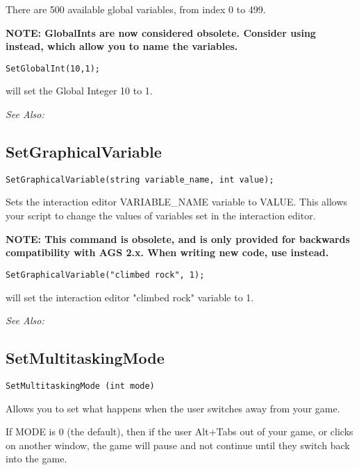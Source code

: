 There are 500 available global variables, from index 0 to 499.

\bf{NOTE:} GlobalInts are now considered obsolete. Consider using
 instead, which allow you to name
the variables.

\begin{verbatim}
SetGlobalInt(10,1);
\end{verbatim}
will set the Global Integer 10 to 1.

\it{See Also:} 


\subsection{SetGraphicalVariable}\label{SetGraphicalVariable}%

\begin{verbatim}
SetGraphicalVariable(string variable_name, int value);
\end{verbatim}
Sets the interaction editor VARIABLE_NAME variable to VALUE. This allows your
script to change the values of variables set in the interaction editor.

\bf{NOTE:} This command is obsolete, and is only provided for backwards compatibility
with AGS 2.x. When writing new code, use 
instead.

\begin{verbatim}
SetGraphicalVariable("climbed rock", 1);
\end{verbatim}
will set the interaction editor "climbed rock" variable to 1.

\it{See Also:} 


\subsection{SetMultitaskingMode}\label{SetMultitaskingMode}%

\begin{verbatim}
SetMultitaskingMode (int mode)
\end{verbatim}
Allows you to set what happens when the user switches away from your game.

If MODE is 0 (the default), then if the user Alt+Tabs out of your game, or clicks
on another window, the game will pause and not continue until they switch back into
the game.

